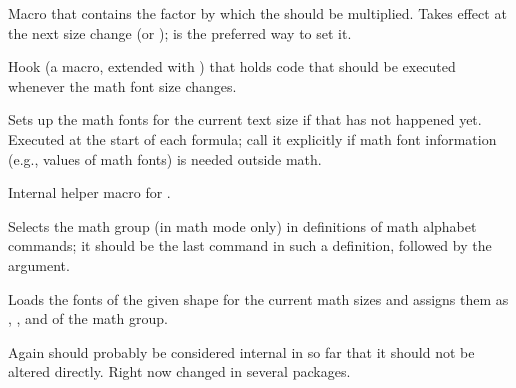 \documentclass{l3in2edoc}
\begin{document}
\begin{function}[user]
  {
    \baselinestretch
  }
  \begin{syntax}
  \end{syntax}
  Macro that contains the factor by which the  should
  be multiplied. Takes effect at the next size change (or
  );  is the preferred way to set it.
\end{function}


\begin{function}[]
  {
    \every@math@size
  }
  Hook (a macro, extended with ) that holds code
  that should be executed whenever the math font size changes.
\end{function}




\begin{function}[]
  {
    \check@mathfonts
  }
  Sets up the math fonts for the current text size if that has not
  happened yet. Executed at the start of each formula; call it
  explicitly if math font information (e.g.,  values of
  math fonts) is needed outside math.
\end{function}



\begin{function}[int]
  {
    \init@restore@glb@settings
  }
 Internal helper macro for .
\end{function}



\begin{function}[]
  {
    \use@mathgroup
  }
  \begin{syntax}
      
  \end{syntax}
  Selects the math group (in math mode only) in definitions of math
  alphabet commands; it should be the last command in such a
  definition, followed by the argument.
\end{function}








\begin{function}[int]
  {
    \getanddefine@fonts
  }
  \begin{syntax}
      
  \end{syntax}
  Loads the fonts of the given shape for the current math sizes and
  assigns them as , , and
   of the math group.

  Again should probably be considered internal in so far that it
  should not be altered directly. Right now changed in several
  packages.
\end{function}
\end{document}
